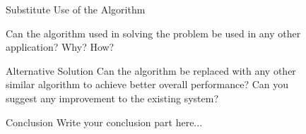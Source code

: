 \documentclass[final]{beamer}
\newlength{\sepwidth}
\newlength{\colwidth}
\newcommand{\separatorcolumn}{\begin{column}{\sepwidth}\end{column}}
\begin{document}
\begin{frame}[t]
\begin{columns}[t]
\begin{column}{\colwidth}
			
		\end{column}
	
		\separatorcolumn
		
		\begin{column}{\colwidth}
			
			\begin{alertblock}{Substitute Use of the Algorithm}{}
            
            Can the algorithm used in solving the problem be used in any other application? Why? How?

            
			\end{alertblock}
   
   		\begin{alertblock}{Alternative Solution}
			\justifying
             Can the algorithm be replaced with any other similar algorithm to achieve better overall performance? Can you suggest any improvement to the existing system?


             
			\end{alertblock}
   
			\begin{alertblock}{Conclusion}
			\justifying
             Write your conclusion part here...

             
			\end{alertblock}
		\end{column}
		
		\separatorcolumn
	\end{columns}
    \end{frame}
\end{document}
